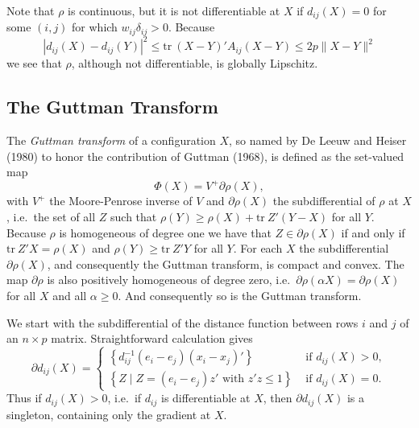 \documentclass[
  12pt,
]{article}
\begin{document}
Note that \(\rho\) is continuous, but it is not differentiable at \(X\) if
\(d_{ij}(X)=0\) for some \((i,j)\) for which \(w_{ij}\delta_{ij}>0\). Because
\begin{equation}
|d_{ij}(X)-d_{ij}(Y)|^2\leq\text{tr}\ (X-Y)'A_{ij}(X-Y)\leq 2p\|X-Y\|^2
\label{eq:lipschitz}
\end{equation}
we see that \(\rho\), although not differentiable, is globally Lipschitz.

\subsection{The Guttman Transform}\label{the-guttman-transform}

The \emph{Guttman transform} of a configuration \(X\), so named by De Leeuw and Heiser (1980) to honor the contribution of Guttman (1968), is defined as the set-valued map
\begin{equation}
\Phi(X)=V^+\partial\rho(X),
\label{eq:phidef}
\end{equation}
with \(V^+\) the Moore-Penrose inverse of \(V\) and \(\partial\rho(X)\) the
subdifferential of \(\rho\) at \(X\), i.e.~the set of all \(Z\) such that
\(\rho(Y)\geq\rho(X)+\text{tr}\ Z'(Y-X)\)
for all \(Y\). Because \(\rho\) is homogeneous of degree one we have that \(Z\in\partial\rho(X)\)
if and only if \(\text{tr}\ Z'X=\rho(X)\) and
\(\rho(Y)\geq\text{tr}\ Z'Y\) for all \(Y\). For each \(X\)
the subdifferential \(\partial\rho(X)\), and consequently the Guttman transform, is compact and convex. The map \(\partial\rho\)
is also positively homogeneous of degree zero, i.e.~\(\partial\rho(\alpha X)=\partial\rho(X)\) for all \(X\) and all \(\alpha\geq 0\). And consequently so is the
Guttman transform.

We start with the subdifferential of the distance function between
rows \(i\) and \(j\) of an \(n\times p\) matrix. Straightforward calculation
gives
\begin{equation}
\partial d_{ij}(X)=\begin{cases}
\left\{d_{ij}^{-1}(e_i-e_j)(x_i-x_j)'\right\}&\text{ if }d_{ij}(X)>0,\\
\left\{Z\mid Z=(e_i-e_j)z'\text{ with }z'z\leq1\right\}&\text{ if }d_{ij}(X)=0.
\end{cases}
\label{eq:dsubsef}
\end{equation}
Thus if \(d_{ij}(X)>0\), i.e.~if \(d_{ij}\) is differentiable at \(X\),
then \(\partial d_{ij}(X)\) is a singleton, containing only the gradient
at \(X\).
\end{document}
